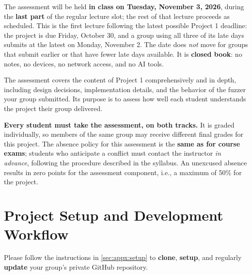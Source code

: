 \documentclass[letterpaper,11pt]{article}
\begin{document}
The assessment will be held \textbf{in class on Tuesday, November 3, 2026},
during the \textbf{last part} of the regular lecture slot; the rest of that
lecture proceeds as scheduled. This is the first lecture following the latest
possible Project 1 deadline: the project is due Friday, October 30, and a group
using all three of its late days submits at the latest on Monday, November
2. The date does \emph{not} move for groups that submit earlier or that have
fewer late days available. It is \textbf{closed book}: no notes, no devices, no
network access, and no AI tools.

The assessment covers the content of Project 1 comprehensively and in depth,
including design decisions, implementation details, and the behavior of the
fuzzer your group submitted. Its purpose is to assess how well each student
understands the project their group delivered.

\textbf{Every student must take the assessment, on both tracks.} It is graded
individually, so members of the same group may receive different final grades
for this project. The absence policy for this assessment is the \textbf{same as
for course exams}; students who anticipate a conflict must contact the
instructor \emph{in advance}, following the procedure described in the
syllabus. An unexcused absence results in zero points for the assessment
component, i.e., a maximum of 50\% for the project.


\section{Project Setup and Development Workflow}

Please follow the instructions in \autoref{sec:appx:setup} to \textbf{clone}, \textbf{setup}, and regularly \textbf{update} your group's private GitHub repository.

\end{document}
